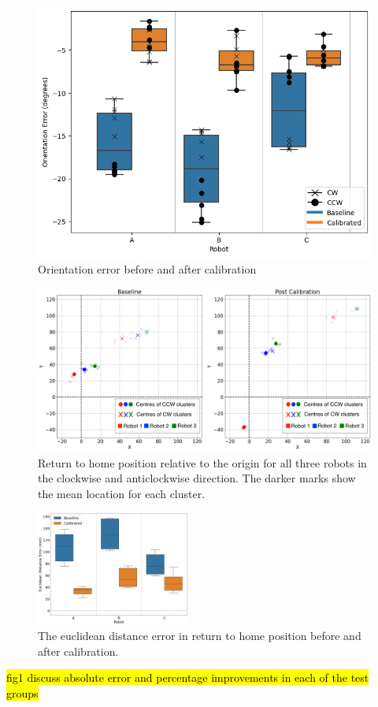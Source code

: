 \documentclass[conference]{IEEEtran}
\begin{document}
\begin{figure}[]
    \centering
    \includegraphics[width=.45\textwidth]{img/orientation_error.png}
    \caption{Orientation error before and after calibration}
    \label{fig:orientation}
\end{figure}


\begin{figure}[]
    \centering
    \includegraphics[width=.8\textwidth]{img/xy_pre_post.png}
    \caption{Return to home position relative to the origin for all three robots in the clockwise and anticlockwise direction. The darker marks show the mean location for each cluster.}
    \label{fig:xy_scatter}
\end{figure}

\begin{figure}
    \centering
    \includegraphics[width = 0.45\textwidth]{img/xy_error_boxplot.png}
    \caption{The euclidean distance error in return to home position before and after calibration.}
    \label{fig:xy_box}
\end{figure}

\hl{fig1 discuss absolute error and percentage improvements in each of the test groups }
\end{document}
